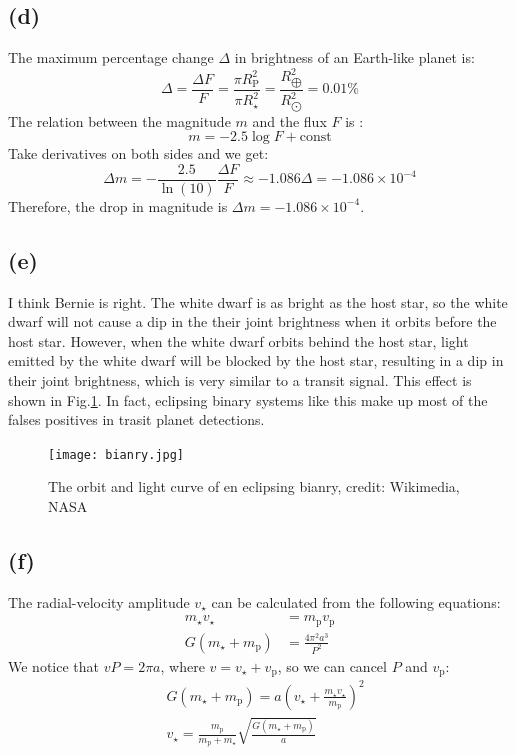 \documentclass[a4paper,12pt]{article}
\begin{document}
\subsection*{(d)}
The maximum percentage change $\Delta$ in brightness 
of an Earth-like planet is:
\begin{equation}
    \Delta = \frac{\Delta F}{F} = \frac{\pi R_\text{P}^2}{\pi R_\star^2}
     = \frac{R_{\bigoplus}^2}{R_{\bigodot}^2}
     = 0.01 \%
\end{equation}
The relation between the magnitude $m$ and the flux $F$
is :
\begin{equation}
    m = -2.5 \log F + \text{const}
\end{equation}
Take derivatives on both sides and we get:
\begin{equation}
    \Delta m = -\frac{2.5}{\ln (10)} \frac{\Delta F}{F} \approx -1.086 \Delta = -1.086 \times 10^{-4}
\end{equation}
Therefore, the drop in magnitude is $\Delta m = -1.086 \times 10^{-4}$.

\subsection*{(e)}
I think Bernie is right. The white dwarf is as bright as the host star, so 
the white dwarf will not cause a dip in the their joint brightness when it orbits before the host star.
However, when the white dwarf orbits behind the host star, light emitted 
by the white dwarf will be blocked by the host star, resulting in a dip in their 
joint brightness, which is very similar to a transit signal. This effect 
is shown in Fig.\ref{binary}. In fact, eclipsing binary systems like 
this make up most of the falses positives in trasit planet detections.
\begin{figure}[htbp]
    \centering
    \texttt{[image: bianry.jpg]}
    \caption{The orbit and light curve of en eclipsing bianry, credit: Wikimedia, NASA}
    \label{binary}
\end{figure}

\subsection*{(f)}
The radial-velocity amplitude $v_{\star}$ can be calculated from the following equations:
\begin{align}
    m_{\star} v_{\star} &= m_\text{p} v_\text{p} \\
    G(m_{\star} + m_\text{p}) &= \frac{4\pi^2 a^3}{P^2}
\end{align}
We notice that $vP = 2\pi a$, where $v = v_{\star}+v_\text{p}$, 
so we can cancel $P$ and $v_\text{p}$:
\begin{align*}
    & G(m_{\star} + m_\text{p}) = a (v_\star + \frac{m_{\star}v_{\star}}{m_\text{p}})^2 \\
    & v_\star = \frac{m_{\text{p}}}{m_{\text{p}}+m_\star} \sqrt{\frac{G(m_{\star} + m_\text{p})}{a}}
\end{align*}
\end{document}
